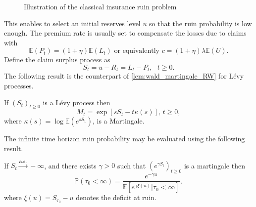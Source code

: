 \begin{figure} 
\begin{center}
\end{center}
\label{fig:ruin_time_CL}
\caption{Illustration of the classical insurance ruin problem}
\end{figure}
This enables to select an initial reserves level $u$ so that the ruin probability is low enough. The premium rate is usually set to compensate the losses due to claims with 
$$
\mathbb{E}(P_t) = (1+\eta)\mathbb{E}(L_t)\text{ or  equivalently } c = (1+\eta)\lambda\mathbb{E}(U).
$$
Define the claim surplus process as
$$
S_t = u - R_t = L_t-P_t,\text{ }t\geq 0.
$$
The following result is the counterpart of \cref{lem:wald_martingale_RW} for Lévy processes.
\begin{prop}\label{prop:wald_martingale_levy}
If $(S_t)_{t\geq0}$ is a L\'evy process then
$$
M_t = \exp\left[s S_t-t\kappa(s)\right]\text{, }t\geq0,
$$
where $\kappa(s)=\log\mathbb{E}\left(e^{s S_1}\right)$, is a Martingale.
\end{prop}
The infinite time horizon ruin probability may be evaluated using the following result.
\begin{prop}\label{prop:ruin_proba_levy}
If $S_t\overset{\textbf{a.s.}}{\rightarrow} -\infty$, and there exists $\gamma>0$ such that $\left(e^{\gamma S_t}\right)_{t\geq0}$ is a martingale then
$$
\mathbb{P}(\tau_0<\infty)=\frac{e^{-\gamma u}}{\mathbb{E}\left[e^{\gamma \xi(u)}|\tau_0<\infty\right]},
$$
where $\xi(u)=S_{\tau_0}-u$ denotes the deficit at ruin.
\end{prop}
